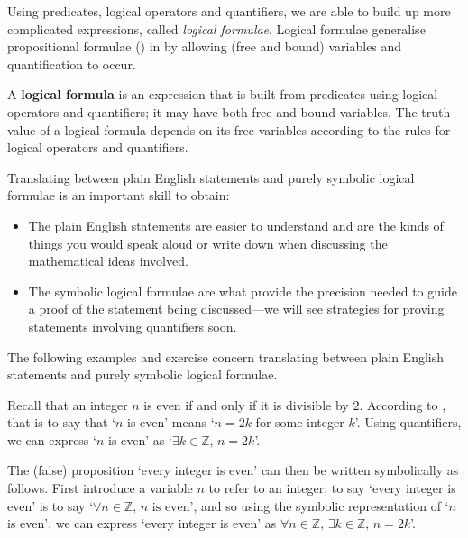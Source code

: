 Using predicates, logical operators and quantifiers, we are able to build up more complicated expressions, called \textit{logical formulae}. Logical formulae generalise propositional formulae () in by allowing (free and bound) variables and quantification to occur.

\begin{definition}
\label{defLogicalFormula}
A \textbf{logical formula} is an expression that is built from predicates using logical operators and quantifiers; it may have both free and bound variables. The truth value of a logical formula depends on its free variables according to the rules for logical operators and quantifiers.
\end{definition}

Translating between plain English statements and purely symbolic logical formulae is an important skill to obtain:
\begin{itemize}
\item The plain English statements are easier to understand and are the kinds of things you would speak aloud or write down when discussing the mathematical ideas involved.
\item The symbolic logical formulae are what provide the precision needed to guide a proof of the statement being discussed---we will see strategies for proving statements involving quantifiers soon.
\end{itemize}

The following examples and exercise concern translating between plain English statements and purely symbolic logical formulae.

\begin{example}
Recall that an integer $n$ is even if and only if it is divisible by $2$. According to , that is to say that `$n$ is even' means `$n=2k$ for some integer $k$'. Using quantifiers, we can express `$n$ is even' as `$\exists k \in \mathbb{Z},\, n=2k$'.

The (false) proposition `every integer is even' can then be written symbolically as follows. First introduce a variable $n$ to refer to an integer; to say `every integer is even' is to say `$\forall n \in \mathbb{Z},\, n \text{ is even}$', and so using the symbolic representation of `$n$ is even', we can express `every integer is even' as $\forall n \in \mathbb{Z},\, \exists k \in \mathbb{Z},\, n=2k$'.
\end{example}

